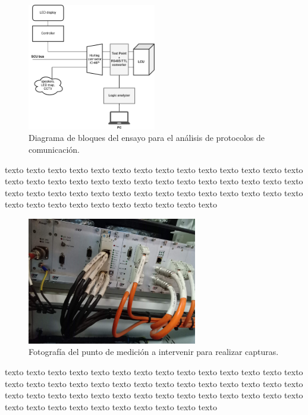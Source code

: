 \documentclass[
11pt, %
]{charter}
\begin{document}
\begin{figure}[htpb]
\centering 
\includegraphics[width=0.5\textwidth]{./Pics/sniffingDiagram.drawio.png}
\caption{Diagrama de bloques del ensayo para el análisis de protocolos de comunicación.}
\label{fig:sniffingDiagram}
\end{figure}

texto texto texto texto texto texto texto texto texto texto texto texto texto texto texto texto texto texto texto texto texto texto texto texto texto texto texto texto texto texto texto texto texto texto texto texto texto texto texto texto texto texto texto texto texto texto texto texto texto texto texto texto 



\begin{figure}[htpb]
\centering 
\includegraphics[width=0.66\textwidth]{./Pics/IMG_20210322_122403.jpg}
\caption{Fotografía del punto de medición a intervenir para realizar capturas.}
\label{fig:NOsniffingPhoto}
\end{figure}

texto texto texto texto texto texto texto texto texto texto texto texto texto texto texto texto texto texto texto texto texto texto texto texto texto texto texto texto texto texto texto texto texto texto texto texto texto texto texto texto texto texto texto texto texto texto texto texto texto texto texto texto 
\end{document}
